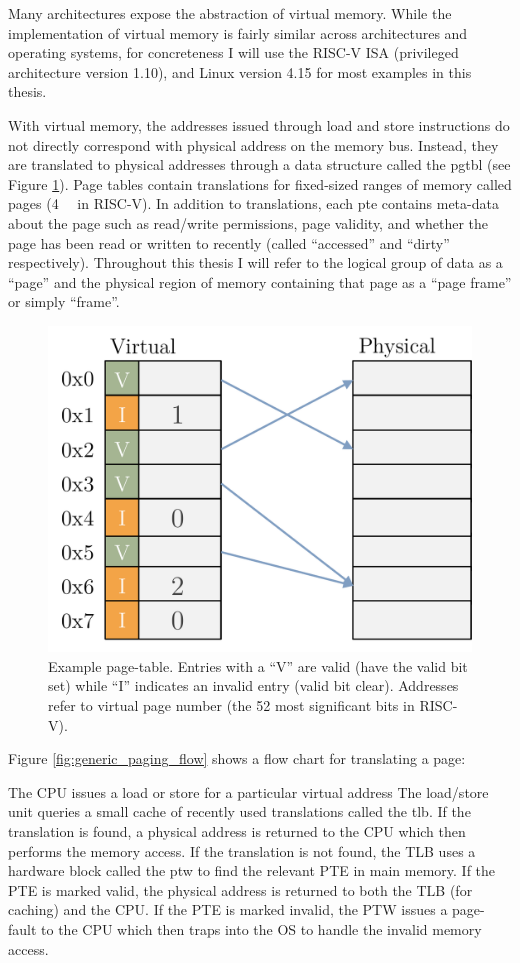 Many architectures expose the abstraction of virtual memory. While the
implementation of virtual memory is fairly similar across architectures and
operating systems, for concreteness I will use the RISC-V ISA (privileged
architecture version 1.10\cite{riscv_priv110}), and Linux version
4.15\cite{linux} for most examples in this thesis.

With virtual memory, the addresses issued through load and store instructions
do not directly correspond with physical address on the memory bus. Instead,
they are translated to physical addresses through a data structure called the
\gls{pgtbl} (see Figure \ref{fig:generic_paging}).  Page tables contain
translations for fixed-sized ranges of memory called \glspl{page} (\SI{4}{\kibi\byte}
in RISC-V). In addition to translations, each \gls{pte} contains meta-data about the page such as read/write permissions, page
validity, and whether the page has been read or written to recently (called
``accessed'' and ``dirty'' respectively). Throughout this thesis I will refer to
the logical group of data as a ``page'' and the physical region of memory
containing that page as a ``page frame'' or simply ``frame''.  

\begin{figure}[h]
    \centering
    \includegraphics[width=0.5\columnwidth]{figs/generic_page_table.pdf}
    \caption{Example page-table. Entries with a ``V'' are valid (have the valid
             bit set) while ``I'' indicates an invalid entry (valid bit clear).
           Addresses refer to virtual page number (the 52 most significant bits
         in RISC-V).}
    \label{fig:generic_paging}
\end{figure}

Figure \ref{fig:generic_paging_flow} shows a flow chart for translating a page:

\begin{outline}[enumerate]
  \1 The CPU issues a load or store for a particular virtual address
  \1 The load/store unit queries a small cache of recently used translations
  called the \gls{tlb}.
    \2 If the translation is found, a physical address is returned to the CPU
    which then performs the memory access.
  \1 If the translation is not found, the TLB uses a hardware block called the
  \gls{ptw} to find the relevant PTE in main memory.
    \2 If the PTE is marked valid, the physical address is returned to both the
    TLB (for caching) and the CPU.
  \1 If the PTE is marked invalid, the PTW issues a page-fault to the CPU which
  then traps into the OS to handle the invalid memory access.
\end{outline}

